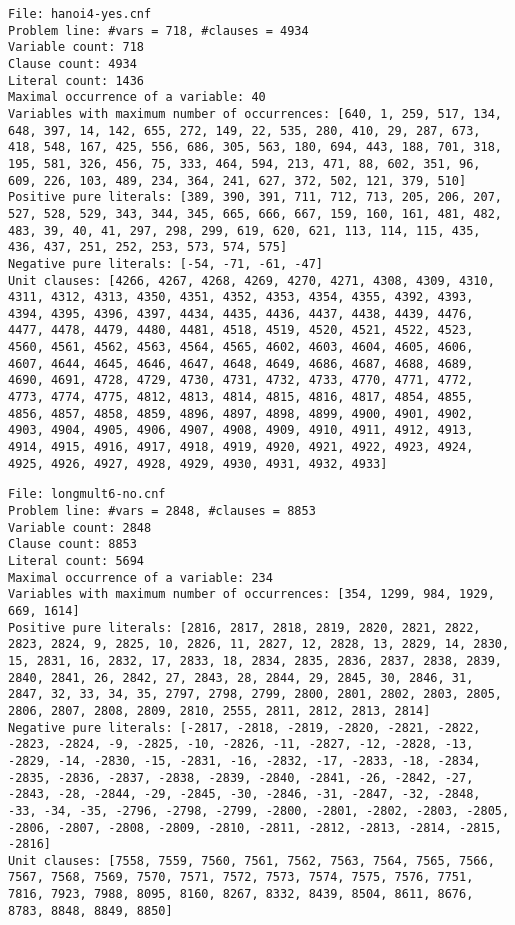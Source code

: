 \documentclass[a4paper,10pt]{article}
\begin{document}
\begin{lstlisting}
File: hanoi4-yes.cnf
Problem line: #vars = 718, #clauses = 4934
Variable count: 718
Clause count: 4934
Literal count: 1436
Maximal occurrence of a variable: 40
Variables with maximum number of occurrences: [640, 1, 259, 517, 134, 648, 397, 14, 142, 655, 272, 149, 22, 535, 280, 410, 29, 287, 673, 418, 548, 167, 425, 556, 686, 305, 563, 180, 694, 443, 188, 701, 318, 195, 581, 326, 456, 75, 333, 464, 594, 213, 471, 88, 602, 351, 96, 609, 226, 103, 489, 234, 364, 241, 627, 372, 502, 121, 379, 510]
Positive pure literals: [389, 390, 391, 711, 712, 713, 205, 206, 207, 527, 528, 529, 343, 344, 345, 665, 666, 667, 159, 160, 161, 481, 482, 483, 39, 40, 41, 297, 298, 299, 619, 620, 621, 113, 114, 115, 435, 436, 437, 251, 252, 253, 573, 574, 575]
Negative pure literals: [-54, -71, -61, -47]
Unit clauses: [4266, 4267, 4268, 4269, 4270, 4271, 4308, 4309, 4310, 4311, 4312, 4313, 4350, 4351, 4352, 4353, 4354, 4355, 4392, 4393, 4394, 4395, 4396, 4397, 4434, 4435, 4436, 4437, 4438, 4439, 4476, 4477, 4478, 4479, 4480, 4481, 4518, 4519, 4520, 4521, 4522, 4523, 4560, 4561, 4562, 4563, 4564, 4565, 4602, 4603, 4604, 4605, 4606, 4607, 4644, 4645, 4646, 4647, 4648, 4649, 4686, 4687, 4688, 4689, 4690, 4691, 4728, 4729, 4730, 4731, 4732, 4733, 4770, 4771, 4772, 4773, 4774, 4775, 4812, 4813, 4814, 4815, 4816, 4817, 4854, 4855, 4856, 4857, 4858, 4859, 4896, 4897, 4898, 4899, 4900, 4901, 4902, 4903, 4904, 4905, 4906, 4907, 4908, 4909, 4910, 4911, 4912, 4913, 4914, 4915, 4916, 4917, 4918, 4919, 4920, 4921, 4922, 4923, 4924, 4925, 4926, 4927, 4928, 4929, 4930, 4931, 4932, 4933]
\end{lstlisting}
\begin{lstlisting}
File: longmult6-no.cnf
Problem line: #vars = 2848, #clauses = 8853
Variable count: 2848
Clause count: 8853
Literal count: 5694
Maximal occurrence of a variable: 234
Variables with maximum number of occurrences: [354, 1299, 984, 1929, 669, 1614]
Positive pure literals: [2816, 2817, 2818, 2819, 2820, 2821, 2822, 2823, 2824, 9, 2825, 10, 2826, 11, 2827, 12, 2828, 13, 2829, 14, 2830, 15, 2831, 16, 2832, 17, 2833, 18, 2834, 2835, 2836, 2837, 2838, 2839, 2840, 2841, 26, 2842, 27, 2843, 28, 2844, 29, 2845, 30, 2846, 31, 2847, 32, 33, 34, 35, 2797, 2798, 2799, 2800, 2801, 2802, 2803, 2805, 2806, 2807, 2808, 2809, 2810, 2555, 2811, 2812, 2813, 2814]
Negative pure literals: [-2817, -2818, -2819, -2820, -2821, -2822, -2823, -2824, -9, -2825, -10, -2826, -11, -2827, -12, -2828, -13, -2829, -14, -2830, -15, -2831, -16, -2832, -17, -2833, -18, -2834, -2835, -2836, -2837, -2838, -2839, -2840, -2841, -26, -2842, -27, -2843, -28, -2844, -29, -2845, -30, -2846, -31, -2847, -32, -2848, -33, -34, -35, -2796, -2798, -2799, -2800, -2801, -2802, -2803, -2805, -2806, -2807, -2808, -2809, -2810, -2811, -2812, -2813, -2814, -2815, -2816]
Unit clauses: [7558, 7559, 7560, 7561, 7562, 7563, 7564, 7565, 7566, 7567, 7568, 7569, 7570, 7571, 7572, 7573, 7574, 7575, 7576, 7751, 7816, 7923, 7988, 8095, 8160, 8267, 8332, 8439, 8504, 8611, 8676, 8783, 8848, 8849, 8850]
\end{lstlisting}
\end{document}
